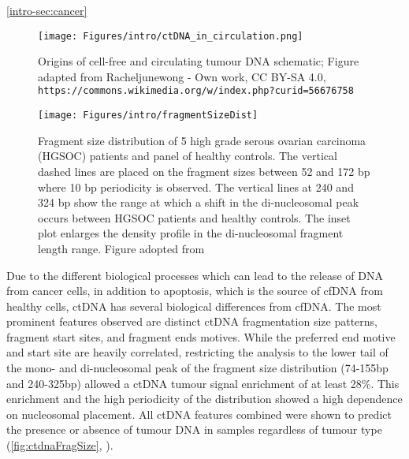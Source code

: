 \autoref{intro-sec:cancer}\cite{Gong2019}\cite{Zhao2022} \cite{Yun2018}\cite{Andreeva2021}

\begin{figure}[hbt]
\centering
\texttt{[image: Figures/intro/ctDNA\_in\_circulation.png]}
\caption{Origins of cell-free and circulating tumour DNA schematic; Figure adapted from Racheljunewong - Own work, CC BY-SA 4.0, \nolinkurl{https://commons.wikimedia.org/w/index.php?curid=56676758}}
\label{fig:ctDNAcirc}
\end{figure}



\begin{figure}[hbt]
\centering
\texttt{[image: Figures/intro/fragmentSizeDist]}
\caption[Fragment size distribution of ctDNA]{Fragment size distribution of 5 high grade serous
ovarian carcinoma (HGSOC) patients and panel of healthy controls. The vertical dashed lines are placed on the fragment sizes between 52 and 172 bp where 10 bp periodicity is observed. The vertical lines at 240 and 324 bp show the range at which a shift in the di-nucleosomal peak occurs between HGSOC patients and healthy controls. The inset plot enlarges the density profile in the di-nucleosomal fragment length range. Figure adopted from \textcite{Markus2022}}\label{fig:ctdnaFragSize}
\end{figure}

Due to the different biological processes which can lead to the release of DNA from cancer cells, in addition to apoptosis, which is the  source of cfDNA from healthy cells, ctDNA has several biological differences from cfDNA. The most prominent features observed are distinct ctDNA fragmentation size patterns, fragment start sites, and fragment ends motives. While the preferred end motive and start site are heavily correlated, restricting the analysis to the lower tail of the mono- and di-nucleosomal peak of the fragment size distribution (74-155bp and 240-325bp) allowed a ctDNA tumour signal enrichment of at least 28\%. This  enrichment and the high periodicity of the distribution showed a high dependence on nucleosomal placement. All ctDNA features combined were shown  to predict the presence or absence of tumour DNA in samples regardless of tumour type  (\autoref{fig:ctdnaFragSize}, \cite{Mouliere2018,Markus2022}).

